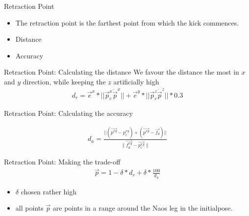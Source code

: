 \documentclass{beamer}
\begin{document}
\begin{frame}{Retraction Point} 
    \begin{itemize}
        \item      The retraction point is the farthest point from which the kick commences.
        \item      Distance
        \item      Accuracy
    \end{itemize}
\end{frame}


\begin{frame}{Retraction Point: Calculating the distance} 
    We favour the distance the most in $x$ and $y$ direction, while keeping the
    $z$ artificially high
        \begin{align}
        d_r = \vec{e}^{x} * || \vec{p}_{c}^{x} \dot \vec{p}^{x} || + \vec{e}^y * ||\vec{p}_{c}^z
            \dot \vec{p}^z|| * 0.3
        \end{align}
\end{frame}

\begin{frame}{Retraction Point: Calculating the accuracy}
    
\begin{figure}
  \resizebox{\textwidth}{!} {
    }
    \label{fig:accuracy}
\end{figure}    
    \begin{align*}
        d_a = \frac{||(\vec{p^{xy}} - p_c^{xy}) \times (\vec{p^{xy}} -
        \vec{f_d})||}{\|\vec{f_d^{xy}}- \vec{p_c^{xy}}\|}
    \end{align*}
\end{frame}


\begin{frame}{Retraction Point: Making the trade-off}
\begin{align*}
    \vec{p} = 1-\delta * d_r + \delta * \frac{100}{d_a}
\end{align*}

\begin{itemize}
    \item $\delta$ chosen rather high
    \item all points $\vec{p}$ are points in a range around the Naos leg in
        the initialpose. 
\end{itemize}
\end{frame}
\end{document}
